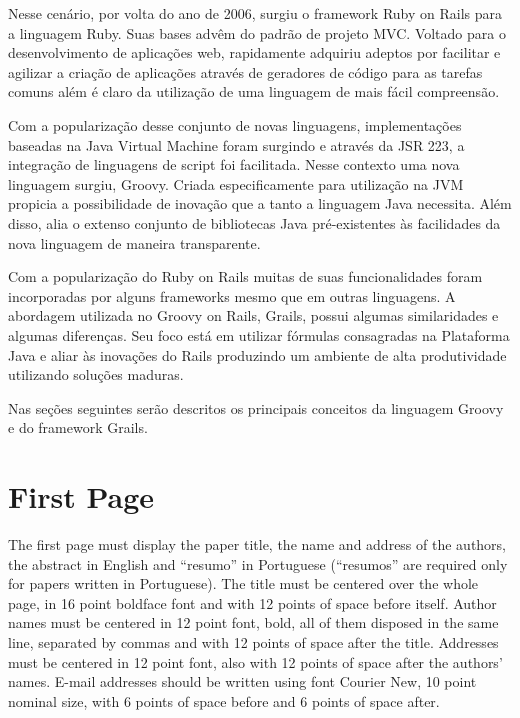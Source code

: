 \documentclass[12pt]{article}
\begin{document}
    Nesse cenário, por volta do ano de 2006, surgiu o framework Ruby on Rails para a linguagem Ruby. Suas bases advêm do padrão de
    projeto MVC. Voltado para o desenvolvimento de aplicações web, rapidamente adquiriu adeptos por facilitar e agilizar a criação 
    de aplicações através de geradores de código para as tarefas comuns além é claro da utilização de uma linguagem de mais fácil
    compreensão.

    Com a popularização desse conjunto de novas linguagens, implementações baseadas na Java Virtual Machine foram surgindo e através 
    da JSR 223, a integração de linguagens de script foi facilitada. Nesse contexto uma nova linguagem surgiu, Groovy. Criada 
    especificamente para utilização na JVM propicia a possibilidade de inovação que a tanto a linguagem Java necessita. Além 
    disso, alia o extenso conjunto de bibliotecas Java pré-existentes às facilidades da nova linguagem de maneira transparente. 
    
    Com a popularização do Ruby on Rails muitas de suas funcionalidades foram incorporadas por alguns frameworks mesmo que em
    outras linguagens. A abordagem utilizada no Groovy on Rails, Grails, possui algumas similaridades e algumas diferenças. 
    Seu foco está em utilizar fórmulas consagradas na Plataforma Java e aliar às inovações do Rails produzindo um ambiente 
    de alta produtividade utilizando soluções maduras.
    
    Nas seções seguintes serão descritos os principais conceitos da linguagem Groovy e do framework Grails.

\section{First Page} \label{sec:firstpage}

The first page must display the paper title, the name and address of the
authors, the abstract in English and ``resumo'' in Portuguese (``resumos'' are
required only for papers written in Portuguese). The title must be centered
over the whole page, in 16 point boldface font and with 12 points of space
before itself. Author names must be centered in 12 point font, bold, all of
them disposed in the same line, separated by commas and with 12 points of
space after the title. Addresses must be centered in 12 point font, also with
12 points of space after the authors' names. E-mail addresses should be
written using font Courier New, 10 point nominal size, with 6 points of space
before and 6 points of space after.
\end{document}
